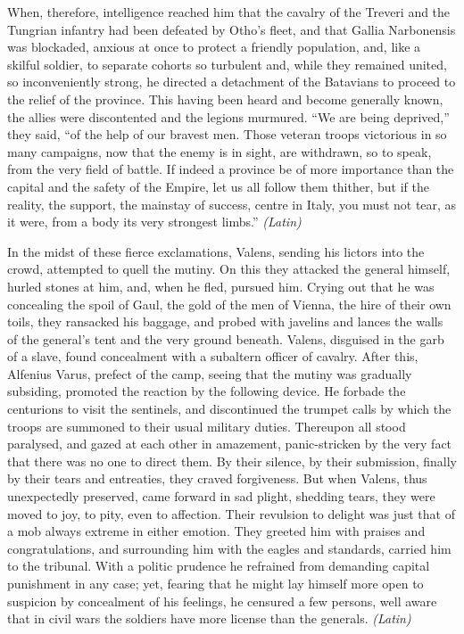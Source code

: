 
When, therefore, intelligence reached him that the cavalry of the Treveri and the Tungrian infantry had been defeated by Otho's fleet, and that Gallia Narbonensis was blockaded, anxious at once to protect a friendly population, and, like a skilful soldier, to separate cohorts so turbulent and, while they remained united, so inconveniently strong, he directed a detachment of the Batavians to proceed to the relief of the province. This having been heard and become generally known, the allies were discontented and the legions murmured. ``We are being deprived,'' they said, ``of the help of our bravest men. Those veteran troops victorious in so many campaigns, now that the enemy is in sight, are withdrawn, so to speak, from the very field of battle. If indeed a province be of more importance than the capital and the safety of the Empire, let us all follow them thither, but if the reality, the support, the mainstay of success, centre in Italy, you must not tear, as it were, from a body its very strongest limbs.'' \emph{(Latin)}


In the midst of these fierce exclamations, Valens, sending his lictors into the crowd, attempted to quell the mutiny. On this they attacked the general himself, hurled stones at him, and, when he fled, pursued him. Crying out that he was concealing the spoil of Gaul, the gold of the men of Vienna, the hire of their own toils, they ransacked his baggage, and probed with javelins and lances the walls of the general's tent and the very ground beneath. Valens, disguised in the garb of a slave, found concealment with a subaltern officer of cavalry. After this, Alfenius Varus, prefect of the camp, seeing that the mutiny was gradually subsiding, promoted the reaction by the following device. He forbade the centurions to visit the sentinels, and discontinued the trumpet calls by which the troops are summoned to their usual military duties. Thereupon all stood paralysed, and gazed at each other in amazement, panic-stricken by the very fact that there was no one to direct them. By their silence, by their submission, finally by their tears and entreaties, they craved forgiveness. But when Valens, thus unexpectedly preserved, came forward in sad plight, shedding tears, they were moved to joy, to pity, even to affection. Their revulsion to delight was just that of a mob always extreme in either emotion. They greeted him with praises and congratulations, and surrounding him with the eagles and standards, carried him to the tribunal. With a politic prudence he refrained from demanding capital punishment in any case; yet, fearing that he might lay himself more open to suspicion by concealment of his feelings, he censured a few persons, well aware that in civil wars the soldiers have more license than the generals. \emph{(Latin)}

